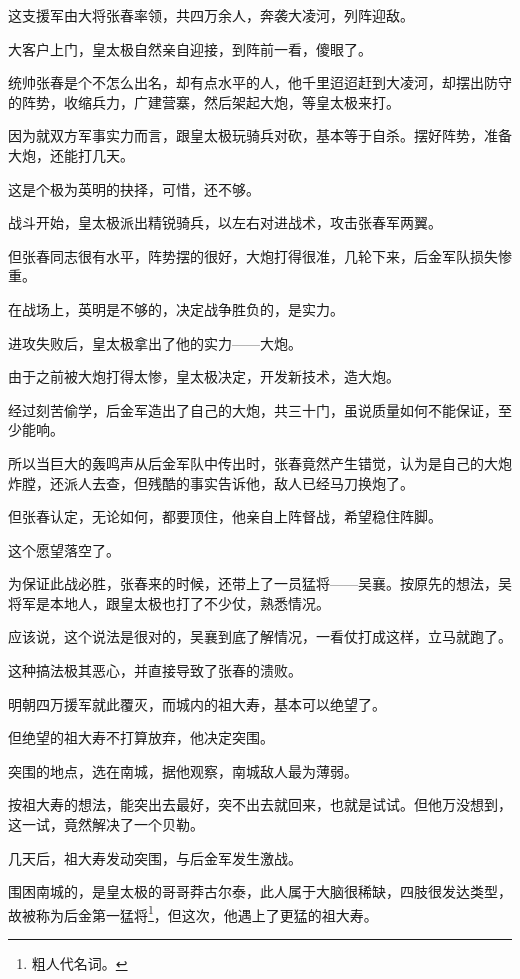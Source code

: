 \begin{multicols}{\theparacolNo}
		这支援军由大将张春率领，共四万余人，奔袭大凌河，列阵迎敌。

		大客户上门，皇太极自然亲自迎接，到阵前一看，傻眼了。

		统帅张春是个不怎么出名，却有点水平的人，他千里迢迢赶到大凌河，却摆出防守的阵势，收缩兵力，广建营寨，然后架起大炮，等皇太极来打。

		因为就双方军事实力而言，跟皇太极玩骑兵对砍，基本等于自杀。摆好阵势，准备大炮，还能打几天。

		这是个极为英明的抉择，可惜，还不够。

		战斗开始，皇太极派出精锐骑兵，以左右对进战术，攻击张春军两翼。

		但张春同志很有水平，阵势摆的很好，大炮打得很准，几轮下来，后金军队损失惨重。

		在战场上，英明是不够的，决定战争胜负的，是实力。

		进攻失败后，皇太极拿出了他的实力——大炮。

		由于之前被大炮打得太惨，皇太极决定，开发新技术，造大炮。

		经过刻苦偷学，后金军造出了自己的大炮，共三十门，虽说质量如何不能保证，至少能响。

		所以当巨大的轰鸣声从后金军队中传出时，张春竟然产生错觉，认为是自己的大炮炸膛，还派人去查，但残酷的事实告诉他，敌人已经马刀换炮了。

		但张春认定，无论如何，都要顶住，他亲自上阵督战，希望稳住阵脚。

		这个愿望落空了。

		为保证此战必胜，张春来的时候，还带上了一员猛将——吴襄。按原先的想法，吴将军是本地人，跟皇太极也打了不少仗，熟悉情况。

		应该说，这个说法是很对的，吴襄到底了解情况，一看仗打成这样，立马就跑了。

		这种搞法极其恶心，并直接导致了张春的溃败。

		明朝四万援军就此覆灭，而城内的祖大寿，基本可以绝望了。

		但绝望的祖大寿不打算放弃，他决定突围。

		突围的地点，选在南城，据他观察，南城敌人最为薄弱。

		按祖大寿的想法，能突出去最好，突不出去就回来，也就是试试。但他万没想到，这一试，竟然解决了一个贝勒。

		几天后，祖大寿发动突围，与后金军发生激战。

		围困南城的，是皇太极的哥哥莽古尔泰，此人属于大脑很稀缺，四肢很发达类型，故被称为后金第一猛将\footnote{粗人代名词。}，但这次，他遇上了更猛的祖大寿。


\end{multicols}
